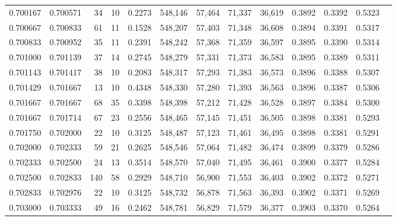 \begin{tabular}{rrrrrrrrrrrrr}
0.700167 & 0.700571 &    34 &  10 &                                     0.2273 & 548,146 &  57,464 &  71,337 &  36,619 & 0.3892 & 0.3392 & 0.5323 \\
0.700667 & 0.700833 &    61 &  11 &                                     0.1528 & 548,207 &  57,403 &  71,348 &  36,608 & 0.3894 & 0.3391 & 0.5317 \\
0.700833 & 0.700952 &    35 &  11 &                                     0.2391 & 548,242 &  57,368 &  71,359 &  36,597 & 0.3895 & 0.3390 & 0.5314 \\
0.701000 & 0.701139 &    37 &  14 &                                     0.2745 & 548,279 &  57,331 &  71,373 &  36,583 & 0.3895 & 0.3389 & 0.5311 \\
0.701143 & 0.701417 &    38 &  10 &                                     0.2083 & 548,317 &  57,293 &  71,383 &  36,573 & 0.3896 & 0.3388 & 0.5307 \\
0.701429 & 0.701667 &    13 &  10 &                                     0.4348 & 548,330 &  57,280 &  71,393 &  36,563 & 0.3896 & 0.3387 & 0.5306 \\
0.701667 & 0.701667 &    68 &  35 &                                     0.3398 & 548,398 &  57,212 &  71,428 &  36,528 & 0.3897 & 0.3384 & 0.5300 \\
0.701667 & 0.701714 &    67 &  23 &                                     0.2556 & 548,465 &  57,145 &  71,451 &  36,505 & 0.3898 & 0.3381 & 0.5293 \\
0.701750 & 0.702000 &    22 &  10 &                                     0.3125 & 548,487 &  57,123 &  71,461 &  36,495 & 0.3898 & 0.3381 & 0.5291 \\
0.702000 & 0.702333 &    59 &  21 &                                     0.2625 & 548,546 &  57,064 &  71,482 &  36,474 & 0.3899 & 0.3379 & 0.5286 \\
0.702333 & 0.702500 &    24 &  13 &                                     0.3514 & 548,570 &  57,040 &  71,495 &  36,461 & 0.3900 & 0.3377 & 0.5284 \\
0.702500 & 0.702833 &   140 &  58 &                                     0.2929 & 548,710 &  56,900 &  71,553 &  36,403 & 0.3902 & 0.3372 & 0.5271 \\
0.702833 & 0.702976 &    22 &  10 &                                     0.3125 & 548,732 &  56,878 &  71,563 &  36,393 & 0.3902 & 0.3371 & 0.5269 \\
0.703000 & 0.703333 &    49 &  16 &                                     0.2462 & 548,781 &  56,829 &  71,579 &  36,377 & 0.3903 & 0.3370 & 0.5264 \\

\end{tabular}
